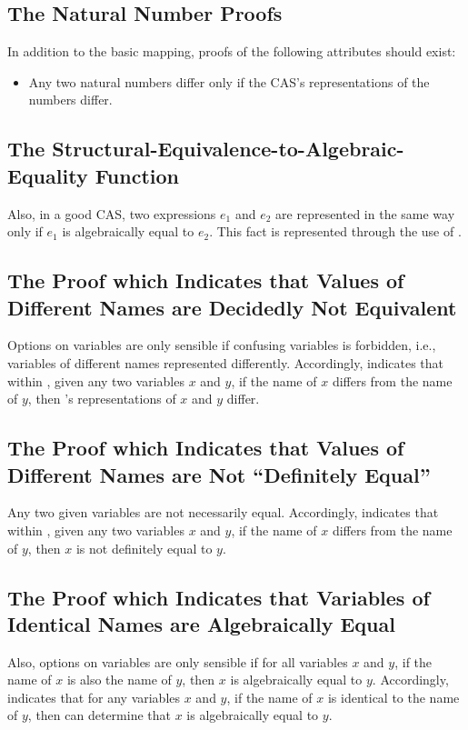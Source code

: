 \documentclass{report}
\begin{document}
\subsection{The Natural Number Proofs}
In addition to the basic mapping, proofs of the following attributes should exist:

\begin{itemize}
  \item Any two natural numbers differ only if the CAS's representations of the numbers differ.
\end{itemize}

\subsection{The Structural-Equivalence-to-Algebraic-Equality Function}
Also, in a good CAS, two expressions \(e_1\) and \(e_2\) are represented in the same way only if \(e_1\) is algebraically equal to \(e_2\).  This fact is represented through the use of .

\subsection{The Proof which Indicates that Values of Different Names are Decidedly Not Equivalent}
Options on variables are only sensible if confusing variables is forbidden, i.e., variables of different names represented differently.  Accordingly,   indicates that within , given any two variables \(x\) and \(y\), if the name of \(x\) differs from the name of \(y\), then 's representations of \(x\) and \(y\) differ.

\subsection{The Proof which Indicates that Values of Different Names are Not ``Definitely Equal''}
Any two given variables are not necessarily equal.  Accordingly,   indicates that within , given any two  variables \(x\) and \(y\), if the name of \(x\) differs from the name of \(y\), then \(x\) is not definitely equal to \(y\).

\subsection{The Proof which Indicates that Variables of Identical Names are Algebraically Equal}
Also, options on variables are only sensible if for all variables \(x\) and \(y\), if the name of \(x\) is also the name of \(y\), then \(x\) is algebraically equal to \(y\).  Accordingly,   indicates that for any  variables \(x\) and \(y\), if the name of \(x\) is identical to the name of \(y\), then  can determine that \(x\) is algebraically equal to \(y\).
\end{document}
